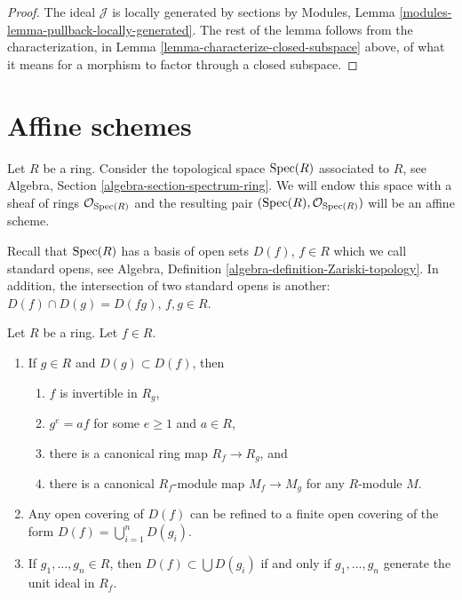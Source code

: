 \begin{proof}
The ideal $\mathcal{J}$ is locally generated by sections
by Modules, Lemma \ref{modules-lemma-pullback-locally-generated}.
The rest of the lemma follows from the characterization,
in Lemma \ref{lemma-characterize-closed-subspace} above,
of what it means for a morphism to factor through a closed
subspace.
\end{proof}














\section{Affine schemes}
\label{section-affine-schemes}

\noindent
Let $R$ be a ring. Consider the topological space $\mathop{\mathrm{Spec}}(R)$
associated to $R$, see Algebra, Section \ref{algebra-section-spectrum-ring}.
We will endow this space with a sheaf of rings $\mathcal{O}_{\mathop{\mathrm{Spec}}(R)}$
and the resulting pair $(\mathop{\mathrm{Spec}}(R), \mathcal{O}_{\mathop{\mathrm{Spec}}(R)})$
will be an affine scheme.

\medskip\noindent
Recall that $\mathop{\mathrm{Spec}}(R)$ has a basis of open sets $D(f)$,
$f \in R$ which we call standard opens, see Algebra,
Definition \ref{algebra-definition-Zariski-topology}.
In addition, the intersection of two standard opens is another:
$D(f) \cap D(g) = D(fg)$, $f, g\in R$.

\begin{lemma}
\label{lemma-standard-open}
Let $R$ be a ring. Let $f \in R$.
\begin{enumerate}
\item If $g\in R$ and $D(g) \subset D(f)$, then
\begin{enumerate}
\item $f$ is invertible in $R_g$,
\item $g^e = af$ for some $e \geq 1$ and $a \in R$,
\item there is a canonical ring map $R_f \to R_g$, and
\item there is a canonical $R_f$-module map
$M_f \to M_g$ for any $R$-module $M$.
\end{enumerate}
\item Any open covering of $D(f)$ can be refined to a finite
open covering of the form $D(f) = \bigcup_{i = 1}^n D(g_i)$.
\item If $g_1, \ldots, g_n \in R$, then $D(f) \subset \bigcup D(g_i)$
if and only if $g_1, \ldots, g_n$ generate the unit ideal in $R_f$.
\end{enumerate}
\end{lemma}

